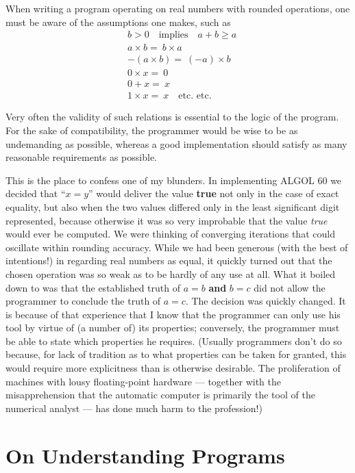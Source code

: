 When writing a program operating on real numbers with rounded operations, one must be aware of the assumptions one makes, such as
\begin{align*}
		&b > 0\quad \text{implies}\quad a + b \geqslant a\\
		&a\times b =\ b\times a\\
		&-(a \times  b) =\ (-a)\times b\\
		&0\times  x =\ 0\\
		&0 + x =\ x\\
		&1\times x =\ x\quad\text{etc. etc.}
\end{align*}


Very often the validity of such relations is essential to the logic of the program. For the sake of compatibility, the programmer would be wise to be as undemanding as possible, whereas a good implementation should satisfy as many reasonable requirements as possible.

This is the place to confess one of my blunders. In implementing ALGOL 60 we decided that ``$x = y$'' would deliver the value \textbf{true} not only in the case of exact equality, but also when the two values differed only in the least significant digit represented, because otherwise it was so very improbable that the value \textit{true} would ever be computed. We were thinking of converging iterations that could oscillate within rounding accuracy. While we had been generous (with the best of intentions!) in regarding real numbers as equal, it quickly turned out that the chosen operation was so weak as to be hardly of any use at all. What it boiled down to was that the established truth of $a = b$ \textbf{and} $b = c$ did not allow the programmer to conclude the truth of $a = c$. The decision was quickly changed. It is because of that experience that I know that the programmer can only use his tool by virtue of (a number of) its properties; conversely, the programmer must be able to state which properties he requires. (Usually programmers don't do so because, for lack of tradition as to what properties can be taken for granted, this would require more explicitness than is otherwise desirable. The proliferation of machines with lousy floating-point hardware --- together with the misapprehension that the automatic computer is primarily the tool of the numerical analyst --- has done much harm to the profession!)

\section[On understanding programs]{On Understanding Programs}
\label{sec:undertanding-programs}

